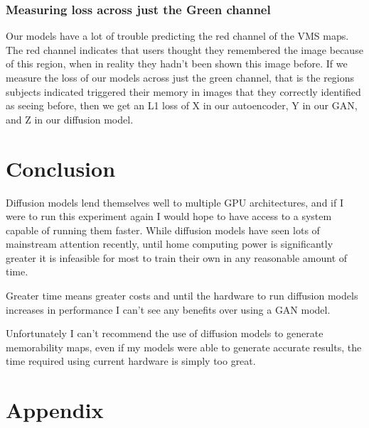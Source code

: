\documentclass{UoYCSproject}
\begin{document}
\subsection{Measuring loss across just the Green channel}

Our models have a lot of trouble predicting the red channel of the VMS maps. The red channel indicates that users thought they remembered the image because of this region, when in reality they hadn't been shown this image before. If we measure the loss of our models across just the green channel, that is the regions subjects indicated triggered their memory in images that they correctly identified as seeing before, then we get an L1 loss of X in our autoencoder, Y in our GAN, and Z in our diffusion model.


\chapter{Conclusion}




Diffusion models lend themselves well to multiple GPU architectures, and if I were to run this experiment again I would hope to have access to a system capable of running them faster. While diffusion models have seen lots of mainstream attention recently, until home computing power is significantly greater it is infeasible for most to train their own in any reasonable amount of time. 

Greater time means greater costs and until the hardware to run diffusion models increases in performance I can't see any benefits over using a GAN model.

Unfortunately I can't recommend the use of diffusion models to generate memorability maps, even if my models were able to generate accurate results, the time required using current hardware is simply too great.

\printbibliography

\chapter{Appendix}
\end{document}
